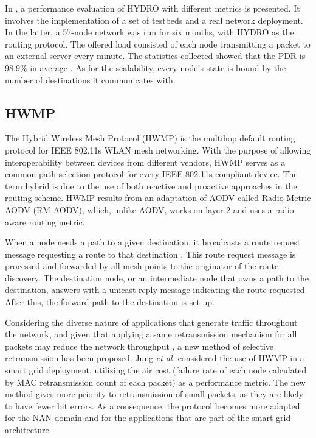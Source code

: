 \documentclass[11pt,draftclsnofoot,onecolumn]{IEEEtran}
\begin{document}
In \cite{Dawson2010}, a performance evaluation of HYDRO with different metrics is presented. It involves the implementation of a set of testbeds and a real network deployment. In the latter, a 57-node network was run for six months, with HYDRO as the routing protocol. The offered load consisted of each node transmitting a packet to an external server every minute. The statistics collected showed that the PDR is 98.9\% in average . As for the scalability, every node's state is bound by the number of destinations it communicates with. 

\subsection{HWMP}\label{hwmp}

The Hybrid Wireless Mesh Protocol (HWMP) is the multihop default routing protocol for IEEE 802.11s WLAN mesh networking. With the purpose of allowing interoperability between devices from different vendors, HWMP serves as a common path selection protocol for every IEEE 802.11s-compliant device. The term hybrid is due to the use of both reactive and proactive approaches in the routing scheme. HWMP results from an adaptation of AODV called Radio-Metric AODV (RM-AODV), which, unlike AODV, works on layer 2 and uses a radio-aware routing metric. 

When a node needs a path to a given destination, it broadcasts a route request message requesting a route to that destination \cite{Bahr2006}. This route request message is processed and forwarded by all mesh points to the originator of the route discovery. The destination node, or an intermediate node that owns a path to the destination, answers with a unicast reply message indicating the route requested. After this, the forward path to the destination is set up. 

Considering the diverse nature of applications that generate traffic throughout the network, and given that applying a same retransmission mechanism for all packets may reduce the network throughput \cite{Meng2014}, a new method of selective retransmission has been proposed. Jung \textit{et al.} \cite{Jung2011} considered the use of HWMP in a smart grid deployment, utilizing the air cost (failure rate of each node calculated by MAC retransmission count of each packet) as a performance metric. The new method gives more priority to retransmission of small packets, as they are likely to have fewer bit errors. As a consequence, the protocol becomes more adapted for the NAN domain and for the applications that are part of the smart grid architecture. 
\end{document}
